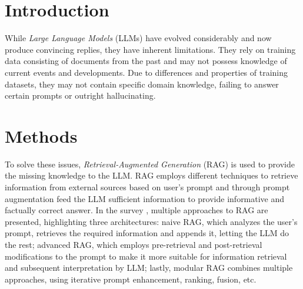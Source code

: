 \documentclass[fleqn,moreauthors,10pt]{ds_report}
\affiliation{\textit{Advisors: Aleš Žagar}}
\begin{document}
\flushbottom 

\maketitle 

\thispagestyle{empty} 


\section*{Introduction}
	
While \textit{Large Language Models} (LLMs) have evolved considerably and now produce convincing replies, they have inherent limitations. They rely on training data consisting of documents from the past and may not possess knowledge of current events and developments. Due to differences and properties of training datasets, they may not contain specific domain knowledge, failing to answer certain prompts or outright hallucinating. 



\section*{Methods}

To solve these issues, \textit{Retrieval-Augmented Generation} (RAG) is used to provide the missing knowledge to the LLM. RAG employs different techniques to retrieve information from external sources based on user’s prompt and through prompt augmentation feed the LLM sufficient information to provide informative and factually correct answer. In the survey \cite{survey}, multiple approaches to RAG are presented, highlighting three architectures: naive RAG, which analyzes the user’s prompt, retrieves the required information and appends it, letting the LLM do the rest; advanced RAG, which employs pre-retrieval and post-retrieval modifications to the prompt to make it more suitable for information retrieval and subsequent interpretation by LLM; lastly, modular RAG combines multiple approaches, using iterative prompt enhancement, ranking, fusion, etc. 
\end{document}
